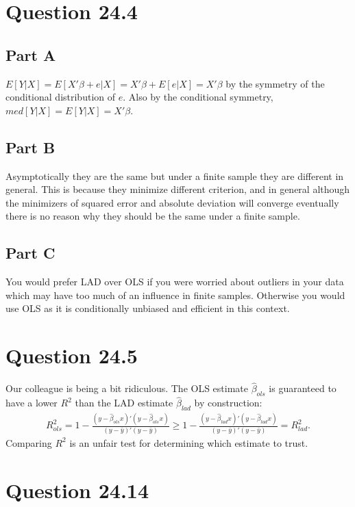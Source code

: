 \documentclass[11pt]{article} %
\begin{document}
\section{Question 24.4}
\subsection{Part A}
$E[Y|X] = E[X'\beta + e|X] = X'\beta + E[e|X] = X'\beta$ by the symmetry of the conditional distribution of $e$. Also by the conditional symmetry, $med[Y|X] = E[Y|X] = X'\beta$.
\subsection{Part B}
Asymptotically they are the same but under a finite sample they are different in general. This is because they minimize different criterion, and in general although the minimizers of squared error and absolute deviation will converge eventually there is no reason why they should be the same under a finite sample.
\subsection{Part C}
You would prefer LAD over OLS if you were worried about outliers in your data which may have too much of an influence in finite samples. Otherwise you would use OLS as it is conditionally unbiased and efficient in this context.
\section{Question 24.5}
Our colleague is being a bit ridiculous. The OLS estimate $\hat{\beta}_{ols}$ is guaranteed to have a lower $R^2$ than the LAD estimate $\hat{\beta}_{lad}$ by construction: \\\begin{align*}R^2_{ols} = 1 - \frac{(y-\hat{\beta}_{ols}x)'(y-\hat{\beta}_{ols}x)}{(y-\bar{y})'(y-\bar{y})} \geq  1 - \frac{(y-\hat{\beta}_{lad}x)'(y-\hat{\beta}_{lad}x)}{(y-\bar{y})'(y-\bar{y})} = R^2_{lad}.\end{align*} Comparing $R^2$ is an unfair test for determining which estimate to trust.
\section{Question 24.14} 
\end{document}
